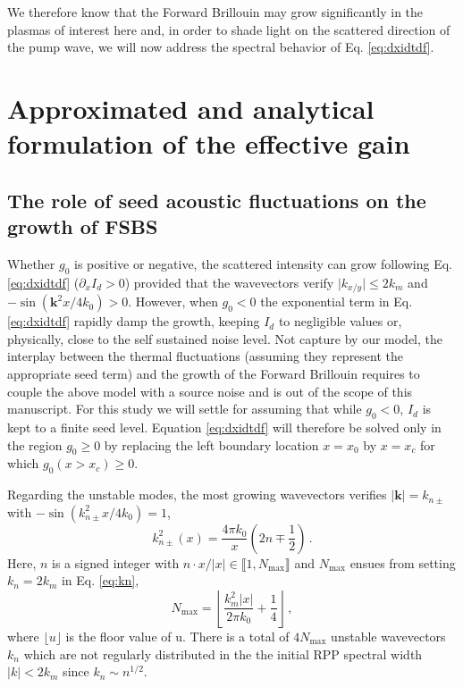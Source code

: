 \documentclass[
 reprint,
 amsmath,amssymb,
 aps,
]{revtex4-1}
\begin{document}
We therefore know that the Forward Brillouin may grow significantly in the plasmas  of interest here and, in order to shade light on the scattered  direction of the pump wave, we will now address the spectral behavior of Eq. \eqref{eq:dxidtdf}.

\section{Approximated and analytical formulation of the effective gain}
\subsection{The role of seed acoustic fluctuations on the growth of FSBS}
Whether $g_0$ is positive or negative,  the scattered intensity can grow following Eq. \eqref{eq:dxidtdf} ($\partial_x I_d>0$) provided that the wavevectors verify $\vert k_{x/y}\vert \le 2k_m$ and $-\sin( \mathbf{k}^2x/4k_0 ) >0$.
However, when $g_0<0$ the exponential term in Eq. \eqref{eq:dxidtdf} rapidly damp the growth, keeping $I_d$ to negligible values or, physically, close to the self sustained noise level.   
Not capture by our model, the interplay between the thermal fluctuations (assuming they represent the   appropriate seed term) and the growth of the Forward Brillouin  requires to couple the above model with a source noise  \cite[]{Yoon_2007,Ruyer_Gremillet_2013} and is out of the scope of this manuscript. 
For this study we will settle for assuming that while $g_0<0$, $I_d$ is kept to a finite seed level. 
Equation \eqref{eq:dxidtdf} will therefore be solved only in the region $g_0\ge 0$ by replacing the left boundary location  $x=x_0$ by $x=x_c$ for which $g_0(x>x_c)\ge 0$. 

Regarding the unstable modes, the most growing wavevectors verifies  $\vert \mathbf{k}\vert =k_{n\pm}$ with  $-\sin(k_{n\pm}^2x/4k_0 ) =1$,
\begin{equation}\label{eq:kn}
    k_{n\pm}^2(x) =\frac{4\pi k_0}{x} \left(2n \mp \frac{1}{2}   \right) \, .
\end{equation}
Here, $n$ is a signed  integer with  $n \cdot x /\vert x\vert\in  \llbracket 1 ,N_\mathrm{max} \rrbracket$ and  $ N_\mathrm{max}$ ensues from setting  $k_n=2k_m$ in Eq. \eqref{eq:kn},
\begin{equation}\label{eq:nmax}
    N_\mathrm{max} =\left\lfloor  \frac{k_m^2\vert x\vert }{2\pi k_0} +\frac{1}{4}   \right\rfloor \,  ,
\end{equation}
where $\lfloor u  \rfloor$ is the floor value of u. 
There is a total of $4N_\mathrm{max}$   unstable wavevectors $k_n$  which are not regularly distributed in the the initial RPP spectral width $\vert k \vert< 2k_m$ since $k_n\sim n^{1/2}$. 
\end{document}
